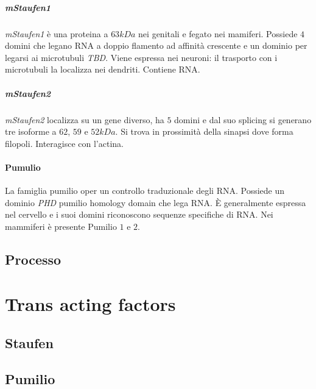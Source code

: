 				\subparagraph{\emph{mStaufen1}}
				\emph{mStaufen1} \`e una proteina a $63kDa$ nei genitali e fegato nei mamiferi.
				Possiede $4$ domini che legano RNA a doppio flamento ad affinit\`a crescente e un dominio per legarsi ai microtubuli \emph{TBD}.
				Viene espressa nei neuroni: il trasporto con i microtubuli la localizza nei dendriti.
				Contiene RNA.

				\subparagraph{\emph{mStaufen2}}
				\emph{mStaufen2} localizza su un gene diverso, ha $5$ domini e dal suo splicing si generano tre isoforme a $62$, $59$ e $52kDa$.
				Si trova in prossimit\`a della sinapsi dove forma filopoli.
				Interagisce con l'actina.

			\paragraph{Pumulio}
			La famiglia pumilio oper un controllo traduzionale degli RNA.
			Possiede un dominio \emph{PHD} pumilio homology domain che lega RNA.
			\`E generalmente espressa nel cervello e i suoi domini riconoscono sequenze specifiche di RNA.
			Nei mammiferi \`e presente Pumilio $1$ e $2$.

			
	
	\subsection{Processo}

\section{Trans acting factors}

	\subsection{Staufen}

	\subsection{Pumilio}




